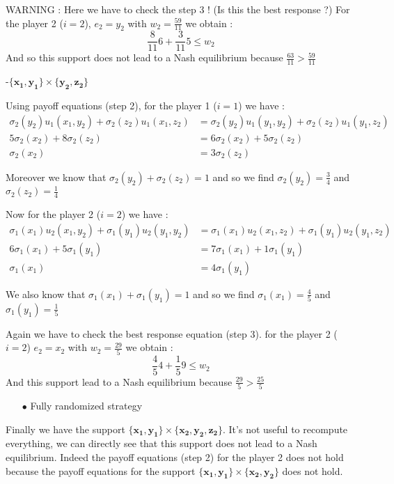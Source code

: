 WARNING : Here we have to check the step 3 ! (Is this the best response ?) For the player 2 ($i=2$), $e_2=y_2$ with $w_2=\frac{59}{11}$ we obtain :
\begin{equation*}
    \frac{8}{11}6 + \frac{3}{11}5 \le w_2
\end{equation*}
And so this support does not lead to a Nash equilibrium because $\frac{63}{11}>\frac{59}{11}$

-$\mathbf{\{x_1,y_1\}}\times\mathbf{\{y_2,z_2\}}$

Using payoff equations (step 2), for the player 1 ($i=1$) we have : 
\begin{align*}
 \sigma_2(y_2)u_1(x_1,y_2) + \sigma_2(z_2)u_1(x_1,z_2) &= \sigma_2(y_2)u_1(y_1,y_2) + \sigma_2(z_2)u_1(y_1,z_2) \\
 5\sigma_2(x_2)+8\sigma_2(z_2)&= 6\sigma_2(x_2) + 5\sigma_2(z_2) \\
 \sigma_2(x_2)&=3\sigma_2(z_2)
\end{align*}

Moreover we know that $\sigma_2(y_2) + \sigma_2(z_2) = 1$ and so we find $\sigma_2(y_2)=\frac{3}{4}$ and $\sigma_2(z_2)=\frac{1}{4}$

Now for the player 2 ($i=2$) we have : 
\begin{align*}
 \sigma_1(x_1)u_2(x_1,y_2) + \sigma_1(y_1)u_2(y_1,y_2) &= \sigma_1(x_1)u_2(x_1,z_2) + \sigma_1(y_1)u_2(y_1,z_2) \\
 6\sigma_1(x_1)+5\sigma_1(y_1)&= 7\sigma_1(x_1) + 1\sigma_1(y_1) \\
 \sigma_1(x_1)&=4\sigma_1(y_1)
\end{align*}

We also know that $\sigma_1(x_1) + \sigma_1(y_1) = 1$ and so we find $\sigma_1(x_1)=\frac{4}{5}$ and $\sigma_1(y_1)=\frac{1}{5}$

Again we have to check the best response equation (step 3). for the player 2 ($i=2$) $e_2=x_2$ with $w_2=\frac{29}{5}$ we obtain :
\begin{equation*}
    \frac{4}{5}4 + \frac{1}{5}9 \le w_2
\end{equation*}
And this support lead to a Nash equilibrium because $\frac{29}{5}>\frac{25}{5}$



\begin{itemize}
  \item[$\bullet$] Fully randomized strategy 
\end{itemize}

Finally we have the support $\mathbf{\{x_1,y_1\}}\times\mathbf{\{x_2,y_2,z_2\}}$. It's not useful to recompute everything, we can directly see that this support does not lead to a Nash equilibrium. Indeed the payoff equations (step 2) for the player 2 does not hold because the payoff equations for the support $\mathbf{\{x_1,y_1\}}\times\mathbf{\{x_2,y_2\}}$  does not hold.


